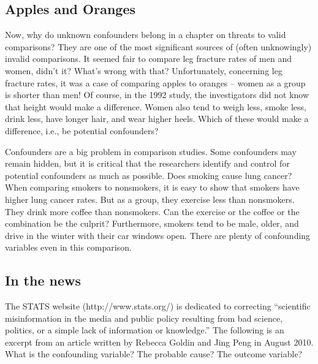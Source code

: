 \documentclass[11pt, chapterprefix=true]{scrbook}\usepackage[]{graphicx}\usepackage[]{color}
\begin{document}
\subsection{Apples and Oranges}

Now, why do unknown confounders belong in a chapter on threats to valid comparisons?  They are one of the most significant sources of (often unknowingly) invalid comparisons.  It seemed fair to compare leg fracture rates of men and women, didn't it?  What's wrong with that?  Unfortunately, concerning leg fracture rates, it was a case of comparing apples to oranges -- women as a group is shorter than men!  Of course, in the 1992 study, the investigators did not know that height would make a difference.  Women also tend to weigh less, smoke less, drink less, have longer hair, and wear higher heels.  Which of these would make a difference, i.e., be potential confounders?

Confounders are a big problem in comparison studies.  Some confounders may remain hidden, but it is critical that the researchers identify and control for potential confounders as much as possible.  Does smoking cause lung cancer?  When comparing smokers to nonsmokers, it is easy to show that smokers have higher lung cancer rates.  But as a group, they exercise less than nonsmokers.  They drink more coffee than nonsmokers.  Can the exercise or the coffee or the combination be the culprit?  Furthermore, smokers tend to be male, older, and drive in the winter with their car windows open.  There are plenty of confounding variables even in this comparison.

\subsection{In the news}

The STATS website (http://www.stats.org/) is dedicated to correcting ``scientific
misinformation in the media and public policy resulting from bad science,
politics, or a simple lack of information or knowledge.''  The following is an excerpt from an article written by Rebecca Goldin and Jing Peng in August 2010.  What is the confounding variable?  The probable cause? The outcome variable?
\end{document}
